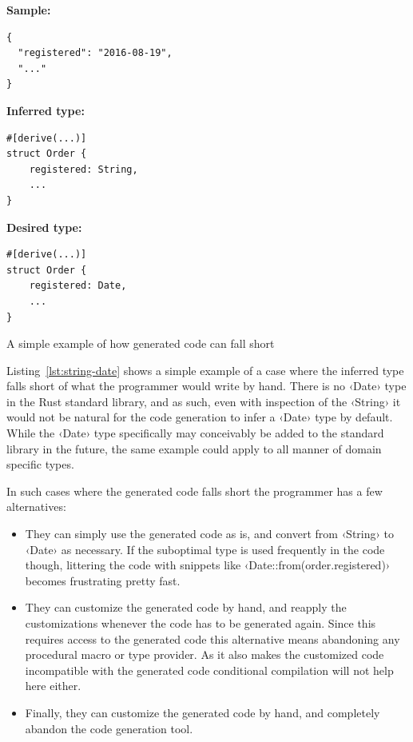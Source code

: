 \begin{listing}[ht!]
\textbf{Sample:}
\begin{verbatim}
{
  "registered": "2016-08-19",
  "..."
}
\end{verbatim}
\vspace{5mm}

\textbf{Inferred type:}
\begin{verbatim}
#[derive(...)]
struct Order {
    registered: String,
    ...
}
\end{verbatim}
\vspace{5mm}

\textbf{Desired type:}
\begin{verbatim}
#[derive(...)]
struct Order {
    registered: Date,
    ...
}
\end{verbatim}
\caption{A simple example of how generated code can fall short}
\label{lst:string-date}
\end{listing}

Listing~\ref{lst:string-date} shows a simple example of a case where the inferred type falls short of what the programmer would write by hand. There is no ‹Date› type in the Rust standard library, and as such, even with inspection of the ‹String› it would not be natural for the code generation to infer a ‹Date› type by default. While the ‹Date› type specifically may conceivably be added to the standard library in the future, the same example could apply to all manner of domain specific types.

In such cases where the generated code falls short the programmer has a few alternatives:

\begin{itemize}
  \item They can simply use the generated code as is, and convert from ‹String› to ‹Date› as necessary. If the suboptimal type is used frequently in the code though, littering the code with snippets like ‹Date::from(order.registered)› becomes frustrating pretty fast.
  \item They can customize the generated code by hand, and reapply the customizations whenever the code has to be generated again. Since this requires access to the generated code this alternative means abandoning any procedural macro or type provider. As it also makes the customized code incompatible with the generated code conditional compilation will not help here either.
  \item Finally, they can customize the generated code by hand, and completely abandon the code generation tool.
\end{itemize}

